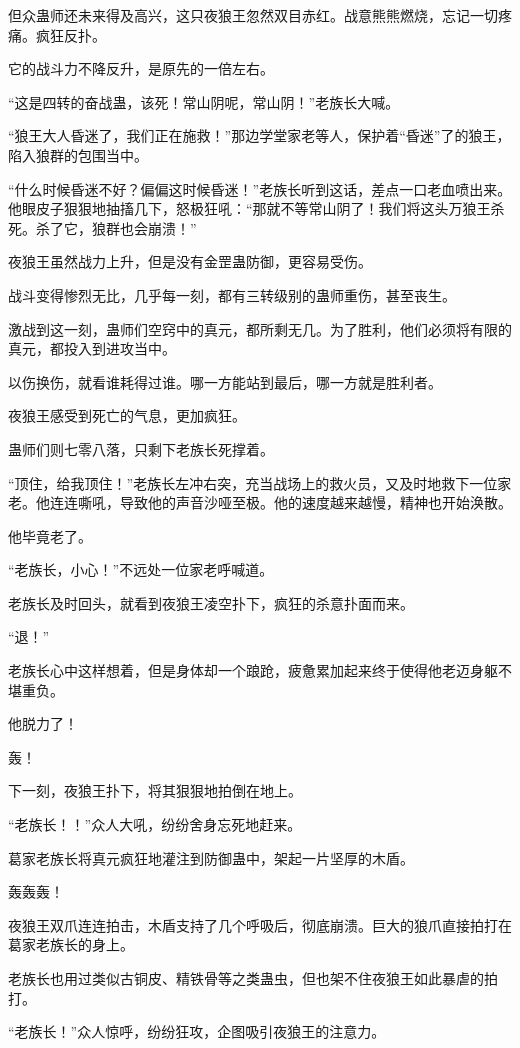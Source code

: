 \begin{this_body}
但众蛊师还未来得及高兴，这只夜狼王忽然双目赤红。战意熊熊燃烧，忘记一切疼痛。疯狂反扑。

它的战斗力不降反升，是原先的一倍左右。

“这是四转的奋战蛊，该死！常山阴呢，常山阴！”老族长大喊。

“狼王大人昏迷了，我们正在施救！”那边学堂家老等人，保护着“昏迷”了的狼王，陷入狼群的包围当中。

“什么时候昏迷不好？偏偏这时候昏迷！”老族长听到这话，差点一口老血喷出来。他眼皮子狠狠地抽搐几下，怒极狂吼：“那就不等常山阴了！我们将这头万狼王杀死。杀了它，狼群也会崩溃！”

夜狼王虽然战力上升，但是没有金罡蛊防御，更容易受伤。

战斗变得惨烈无比，几乎每一刻，都有三转级别的蛊师重伤，甚至丧生。

激战到这一刻，蛊师们空窍中的真元，都所剩无几。为了胜利，他们必须将有限的真元，都投入到进攻当中。

以伤换伤，就看谁耗得过谁。哪一方能站到最后，哪一方就是胜利者。

夜狼王感受到死亡的气息，更加疯狂。

蛊师们则七零八落，只剩下老族长死撑着。

“顶住，给我顶住！”老族长左冲右突，充当战场上的救火员，又及时地救下一位家老。他连连嘶吼，导致他的声音沙哑至极。他的速度越来越慢，精神也开始涣散。

他毕竟老了。

“老族长，小心！”不远处一位家老呼喊道。

老族长及时回头，就看到夜狼王凌空扑下，疯狂的杀意扑面而来。

“退！”

老族长心中这样想着，但是身体却一个踉跄，疲惫累加起来终于使得他老迈身躯不堪重负。

他脱力了！

轰！

下一刻，夜狼王扑下，将其狠狠地拍倒在地上。

“老族长！！”众人大吼，纷纷舍身忘死地赶来。

葛家老族长将真元疯狂地灌注到防御蛊中，架起一片坚厚的木盾。

轰轰轰！

夜狼王双爪连连拍击，木盾支持了几个呼吸后，彻底崩溃。巨大的狼爪直接拍打在葛家老族长的身上。

老族长也用过类似古铜皮、精铁骨等之类蛊虫，但也架不住夜狼王如此暴虐的拍打。

“老族长！”众人惊呼，纷纷狂攻，企图吸引夜狼王的注意力。


\end{this_body}
